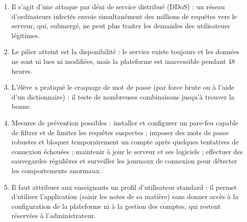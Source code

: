\documentclass[11pt]{article}
\newcommand{\cle}[1]{{\popxbold\color{popdark}#1}}
\begin{document}
\begin{corrige}
\begin{enumerate}
\item Il s'agit d'une attaque par \cle{déni de service distribué} (DDoS) : un réseau d'ordinateurs infectés envoie simultanément des millions de requêtes vers le serveur, qui, submergé, ne peut plus traiter les demandes des utilisateurs légitimes.
\item Le pilier atteint est la \cle{disponibilité} : le service existe toujours et les données ne sont ni lues ni modifiées, mais la plateforme est inaccessible pendant 48 heures.
\item L'élève a pratiqué le \cle{craquage de mot de passe} (par force brute ou à l'aide d'un dictionnaire) : il teste de nombreuses combinaisons jusqu'à trouver la bonne.
\item Mesures de prévention possibles : installer et configurer un pare-feu capable de filtrer et de limiter les requêtes suspectes ; imposer des mots de passe robustes et bloquer temporairement un compte après quelques tentatives de connexion échouées ; maintenir à jour le serveur et ses logiciels ; effectuer des sauvegardes régulières et surveiller les journaux de connexion pour détecter les comportements anormaux.
\item Il faut attribuer aux enseignants un profil d'\cle{utilisateur standard} : il permet d'utiliser l'application (saisir les notes de sa matière) sans donner accès à la configuration de la plateforme ni à la gestion des comptes, qui restent réservées à l'administrateur.
\end{enumerate}
\end{corrige}
\end{document}
